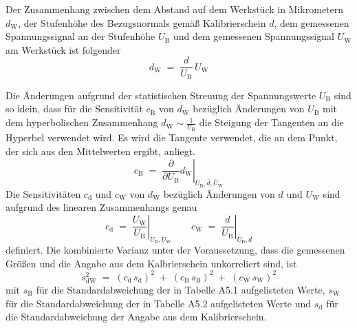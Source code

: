Der Zusammenhang zwischen dem Abstand auf dem Werkstück in Mikrometern $d_\mathrm{W}$,
der Stufenhöhe des Bezugsnormals gemäß Kalibrierschein $d$, dem gemessenen Spannungssignal
an der Stufenhöhe $U_\mathrm{B}$ und dem gemessenen Spannungssignal $U_\mathrm{W}$ am Werkstück
ist folgender
\begin{equation}
d_\mathrm{W} \; = \; \frac{d}{U_\mathrm{B}} \, U_\mathrm{W}
\end{equation}

Die Änderungen aufgrund der statistischen Streuung der Spannungswerte $U_\mathrm{B}$ sind
so klein, dass für die Sensitivität $c_\mathrm{B}$ von $d_\mathrm{W}$
bezüglich Änderungen von $U_\mathrm{B}$
mit dem hyperbolischen Zusammenhang $d_\mathrm{W} \sim \frac{1}{U_\mathrm{B}}$
die Steigung der Tangenten an die Hyperbel verwendet wird. Es wird die
Tangente verwendet, die an dem Punkt, der sich aus den Mittelwerten
ergibt, anliegt.
\begin{equation}
c_\mathrm{B} \; = \; \left. \frac{\partial}{\partial U_\mathrm{B}}
 d_\mathrm{W} \right|_{\bar U_\mathrm{B}, \bar d, \bar U_\mathrm{W}}
\end{equation}
Die Sensitivitäten $c_\mathrm{d}$ und $c_\mathrm{W}$ von $d_\mathrm{W}$
bezüglich Änderungen von $d$ und $U_\mathrm{W}$ sind aufgrund des
linearen Zusammenhangs genau
\begin{equation}
c_\mathrm{d} \; = \; \left. \frac{U_\mathrm{W}}{U_\mathrm{B}} \right|_{\bar U_\mathrm{B}, \bar U_\mathrm{W}} \qquad
c_\mathrm{W} \; = \; \left. \frac{d}{U_\mathrm{B}} \right|_{\bar U_\mathrm{B}, \bar d}
\label{AufgPartiellLinear}
\end{equation}
definiert.
Die kombinierte Varianz unter der Voraussetzung, dass die gemessenen Größen und
die Angabe aus dem Kalbrierschein unkorreliert sind, ist
\begin{equation}
s_\mathrm{dW}^2 \; = \; (c_\mathrm{d} \, s_\mathrm{d})^2 \; + \;
(c_\mathrm{B} \, s_\mathrm{B})^2 \; + \; (c_\mathrm{W} \, s_\mathrm{W})^2
\end{equation}
mit $s_\mathrm{B}$ für die Standardabweichung der in Tabelle A5.1 aufgelisteten Werte,
$s_\mathrm{W}$ für die Standardabweichung der in Tabelle A5.2 aufgelisteten Werte und
$s_\mathrm{d}$ für die Standardabweichung der Angabe aus dem Kalibrierschein.

